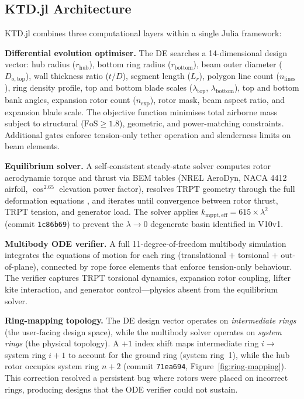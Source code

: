 \documentclass[11pt,a4paper]{article}
\begin{document}
\subsection{KTD.jl Architecture}

KTD.jl combines three computational layers within a single Julia framework:

\textbf{Differential evolution optimiser.} The DE searches a 14-dimensional design vector: hub radius ($r_{\mathrm{hub}}$), bottom ring radius ($r_{\mathrm{bottom}}$), beam outer diameter ($D_{o,\mathrm{top}}$), wall thickness ratio ($t/D$), segment length ($L_r$), polygon line count ($n_{\mathrm{lines}}$), ring density profile, top and bottom blade scales ($\lambda_{\mathrm{top}}$, $\lambda_{\mathrm{bottom}}$), top and bottom bank angles, expansion rotor count ($n_{\mathrm{exp}}$), rotor mask, beam aspect ratio, and expansion blade scale. The objective function minimises total airborne mass subject to structural ($\mathrm{FoS} \geq 1.8$), geometric, and power-matching constraints. Additional gates enforce tension-only tether operation and slenderness limits on beam elements.

\textbf{Equilibrium solver.} A self-consistent steady-state solver computes rotor aerodynamic torque and thrust via BEM tables (NREL AeroDyn, NACA 4412 airfoil, $\cos^{2.65}$ elevation power factor), resolves TRPT geometry through the full deformation equations \cite{wacker2022} \cite{tulloch2023}, and iterates until convergence between rotor thrust, TRPT tension, and generator load. The solver applies $k_{\mathrm{mppt,eff}} = 615 \times \lambda^2$ (commit \texttt{1c86b69}) to prevent the $\lambda \to 0$ degenerate basin identified in V10v1.

\textbf{Multibody ODE verifier.} A full 11-degree-of-freedom multibody simulation integrates the equations of motion for each ring (translational $+$ torsional $+$ out-of-plane), connected by rope force elements that enforce tension-only behaviour. The verifier captures TRPT torsional dynamics, expansion rotor coupling, lifter kite interaction, and generator control—physics absent from the equilibrium solver.

\textbf{Ring-mapping topology.} The DE design vector operates on \emph{intermediate rings} (the user-facing design space), while the multibody solver operates on \emph{system rings} (the physical topology). A $+1$ index shift maps intermediate ring $i \to$ system ring $i+1$ to account for the ground ring (system ring~1), while the hub rotor occupies system ring $n+2$ (commit \texttt{71ea694}, Figure~\ref{fig:ring-mapping}). This correction resolved a persistent bug where rotors were placed on incorrect rings, producing designs that the ODE verifier could not sustain.
\end{document}
